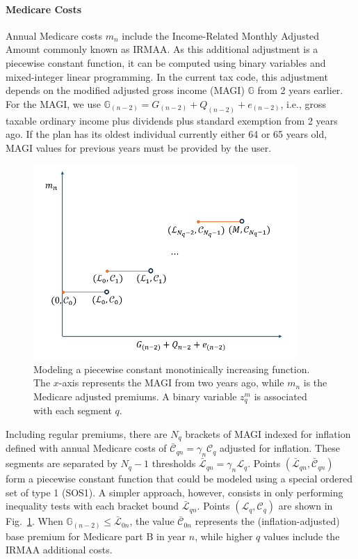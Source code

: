 \documentclass{report}[fleqn,11pt]
\begin{document}
\paragraph*{Medicare Costs}
	Annual Medicare costs $m_n$ include the Income-Related Monthly Adjusted Amount
	commonly known as IRMAA.
	As this additional adjustment
	is a piecewise constant function,
        it can be computed using binary variables and mixed-integer linear
	programming. In the current tax code, this adjustment
	depends on the modified adjusted gross income (MAGI) $\mathbb{G}$ from 2 years earlier. For the
	MAGI, we use $\mathbb{G}_{(n-2)} = G_{(n-2)} + Q_{(n-2)} + e_{(n-2)}$,
	i.e., gross taxable ordinary income plus dividends
	plus standard exemption from 2 years ago.
	If the plan
        has its oldest individual currently either 64 or 65 years old, MAGI values for previous years
	must be provided by the user.
	\begin{figure}[t]
	    \center\includegraphics[width=10cm]{piecewiseConstant.png}
	    \caption{\small Modeling a piecewise constant monotinically increasing function.
	    The $x$-axis represents the MAGI from two years ago, while $m_n$ is the Medicare adjusted premiums.
	    A binary variable $z_q^m$ is associated with each segment $q$.
	    \label{Fig:piecewise}}
	\end{figure}

	Including regular premiums, there are $N_q$ brackets
	of MAGI indexed for inflation defined with annual Medicare costs of
	$\bar{\mathcal{C}}_{qn} = \gamma_n\mathcal{C}_q$ adjusted for inflation.
        These segments are separated by $N_q -1$ thresholds
	$\bar{\mathcal{L}}_{qn} = \gamma_n\mathcal{L}_q$.
        Points $(\bar{\mathcal{L}}_{qn}, \bar{\mathcal{C}}_{qn})$ form a piecewise
	constant function that could be modeled using a special ordered set of type 1 (SOS1).
        A simpler approach, however, consists in only performing inequality tests with
        each bracket bound $\bar{\mathcal{L}}_{qn}$.
	Points $(\mathcal{L}_q, \mathcal{C}_q)$ are shown in Fig.~\ref{Fig:piecewise}.
        When $\mathbb{G}_{(n-2)} \leq \bar{\mathcal{L}}_{0n}$,
	the value $\bar{\mathcal{C}}_{0n}$
	represents the (inflation-adjusted) base premium for Medicare part B in year $n$, while
	higher $q$ values include the IRMAA additional costs.
\end{document}
